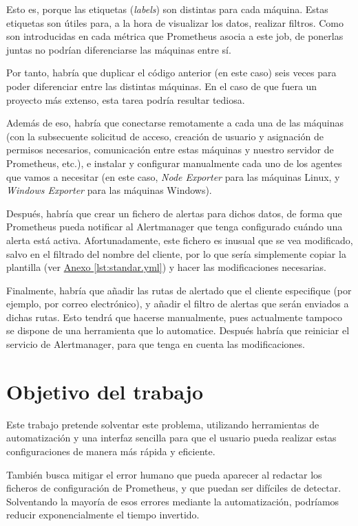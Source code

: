 Esto es, porque las etiquetas (\textit{labels}) son distintas para cada máquina. Estas etiquetas son útiles para, a la hora de visualizar los datos, realizar filtros. Como son introducidas en cada métrica que Prometheus asocia a este job, de ponerlas juntas no podrían diferenciarse las máquinas entre sí.

Por tanto, habría que duplicar el código anterior (en este caso) seis veces para poder diferenciar entre las distintas máquinas. En el caso de que fuera un proyecto más extenso, esta tarea podría resultar tediosa.

Además de eso, habría que conectarse remotamente a cada una de las máquinas (con la subsecuente solicitud de acceso, creación de usuario y asignación de permisos necesarios, comunicación entre estas máquinas y nuestro servidor de Prometheus, etc.), e instalar y configurar manualmente cada uno de los agentes que vamos a necesitar (en este caso, \textit{Node Exporter} para las máquinas Linux, y \textit{Windows Exporter} para las máquinas Windows).

Después, habría que crear un fichero de alertas para dichos datos, de forma que Prometheus pueda notificar al Alertmanager que tenga configurado cuándo una alerta está activa. Afortunadamente, este fichero es inusual que se vea modificado, salvo en el filtrado del nombre del cliente, por lo que sería simplemente copiar la plantilla (ver \hyperref[lst:standar.yml]{Anexo \ref{lst:standar.yml}}) y hacer las modificaciones necesarias.

Finalmente, habría que añadir las rutas de alertado que el cliente especifique (por ejemplo, por correo electrónico), y añadir el filtro de alertas que serán enviados a dichas rutas. Esto tendrá que hacerse manualmente, pues actualmente tampoco se dispone de una herramienta que lo automatice. Después habría que reiniciar el servicio de Alertmanager, para que tenga en cuenta las modificaciones.

\section{Objetivo del trabajo}

Este trabajo pretende solventar este problema, utilizando herramientas de automatización y una interfaz sencilla para que el usuario pueda realizar estas configuraciones de manera más rápida y eficiente.

También busca mitigar el error humano que pueda aparecer al redactar los ficheros de configuración de Prometheus, y que puedan ser difíciles de detectar. Solventando la mayoría de esos errores mediante la automatización, podríamos reducir exponencialmente el tiempo invertido. 